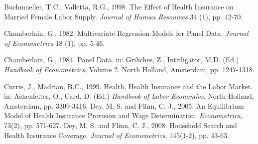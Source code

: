 \documentclass[legno,11pt]{article}
\begin{document}
\begin{thebibliography}{12}


 Buchmueller, T.C., Valletta, R.G., 1998.
                  The Effect of Health Insurance on Married Female Labor Supply.
                  \emph{Journal of Human Resources} 34 (1), pp. 42-70.

 Chamberlain, G., 1982. Multivariate Regression Models for Panel Data. \emph{Journal of Econometrics} 18 (1), pp. 5-46.

 Chamberlain, G., 1984. Panel Data. in: Griliches, Z., Intriligator, M.D. (Ed.)
                  \emph{Handbook of Econometrics}, Volume 2. North Holland, Amsterdam, pp. 1247-1318.

 Currie, J., Madrian, B.C., 1999.
             Health, Health Insurance and the Labor Market.
             in: Ashenfelter, O., Card, D. (Ed.) \emph{Handbook of Labor Economics}. North-Holland, Amsterdam, pp. 3309-3416.
 Dey, M. S. and Flinn, C. J., 2005.
             An Equilibrium Model of Health Insurance
             Provision and Wage Determination. \emph{Econometrica}, 73(2), pp. 571-627.
 Dey, M. S. and Flinn, C. J., 2008.
             Household Search and Health Insurance Coverage.
             \emph{Journal of Econometrics}, 145(1-2), pp. 43-63.




\end{thebibliography}
\end{document}
